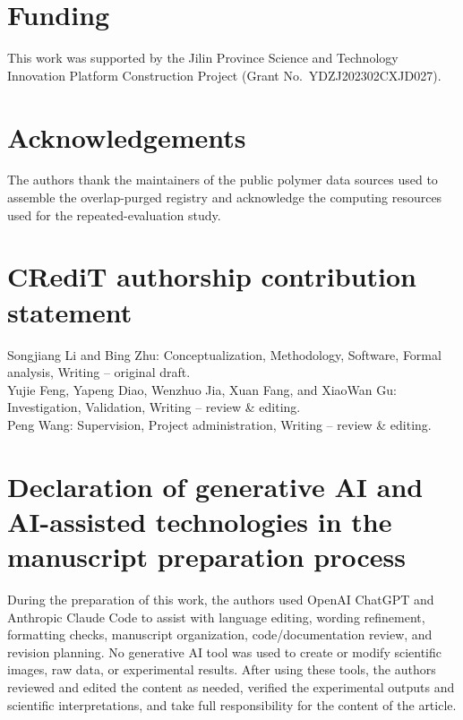 \documentclass[review,12pt]{elsarticle}
\begin{document}
\section*{Funding}
This work was supported by the Jilin Province Science and Technology Innovation Platform Construction Project (Grant No.~YDZJ202302CXJD027).

\section*{Acknowledgements}
The authors thank the maintainers of the public polymer data sources used to assemble the overlap-purged registry and acknowledge the computing resources used for the repeated-evaluation study.

\section*{CRediT authorship contribution statement}
Songjiang Li and Bing Zhu: Conceptualization, Methodology, Software, Formal analysis, Writing -- original draft.\\
Yujie Feng, Yapeng Diao, Wenzhuo Jia, Xuan Fang, and XiaoWan Gu: Investigation, Validation, Writing -- review \& editing.\\
Peng Wang: Supervision, Project administration, Writing -- review \& editing.

\section*{Declaration of generative AI and AI-assisted technologies in the manuscript preparation process}
During the preparation of this work, the authors used OpenAI ChatGPT and Anthropic Claude Code to assist with language editing, wording refinement, formatting checks, manuscript organization, code/documentation review, and revision planning. No generative AI tool was used to create or modify scientific images, raw data, or experimental results. After using these tools, the authors reviewed and edited the content as needed, verified the experimental outputs and scientific interpretations, and take full responsibility for the content of the article.



\end{document}
